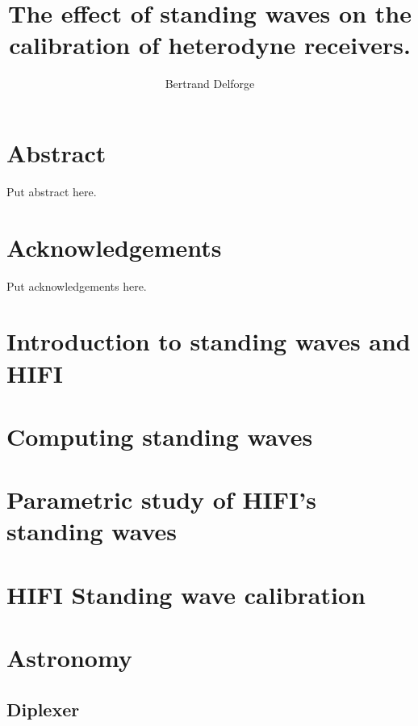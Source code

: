 \documentclass[a4paper,11pt]{book}
\title{The effect of standing waves on the calibration of heterodyne receivers.}
\author{Bertrand Delforge}
\begin{document}
\frontmatter
\maketitle
\tableofcontents
\newpage

\listoffigures
\listofalgorithms
\newpage

\clearpage
\chapter{Abstract}
Put abstract here.

\clearpage
\chapter{Acknowledgements}
Put acknowledgements here.
\mainmatter

\cleardoublepage
\chapter{Introduction to standing waves and HIFI}


\cleardoublepage
\chapter{Computing standing waves}


\cleardoublepage
\chapter{Parametric study of HIFI's standing waves}


\cleardoublepage
\chapter{HIFI Standing wave calibration}


\cleardoublepage
\chapter{Astronomy}


\begin{appendices}
\chapter{Diplexer}

\end{appendices}

\backmatter

\cleardoublepage
{}
\printindex

\cleardoublepage
{}
%
\printbibliography
\end{document}

